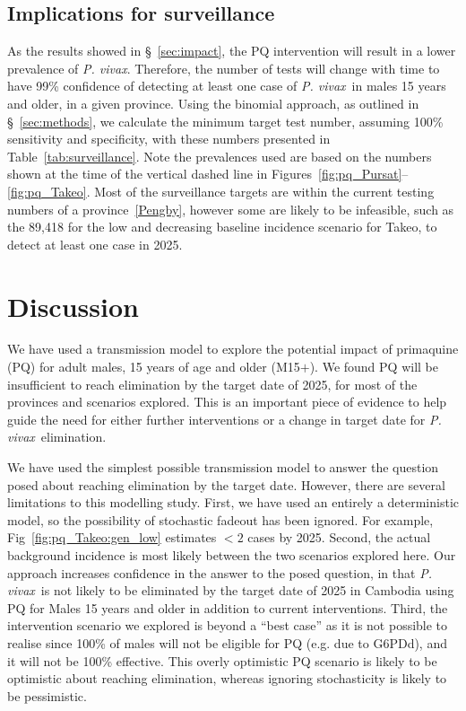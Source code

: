 \documentclass[doublespacing]{bmcart}
\newcommand{\pv}{\textit{P. vivax}}
\newcommand{\males}{M15$+$}
\begin{document}
\subsection*{Implications for surveillance}

As the results showed in \S~\ref{sec:impact}, the PQ intervention will result in a lower prevalence of \pv. Therefore, the number of tests will change with time to have 99\% confidence of detecting at least one case of \pv~in males 15 years and older, in a given province. Using the binomial approach, as outlined in \S~\ref{sec:methods}, we calculate the minimum target test number, assuming 100\% sensitivity and specificity, with these numbers presented in Table~\ref{tab:surveillance}. Note the prevalences used are based on the numbers shown at the time of the vertical dashed line in Figures~\ref{fig:pq_Pursat}--\ref{fig:pq_Takeo}. Most of the surveillance targets are within the current testing numbers of a province~\ref{Pengby}, however some are likely to be infeasible, such as the 89,418 for the low and decreasing baseline incidence scenario for Takeo, to detect at least one case in 2025. 

\section*{Discussion}

We have used a transmission model to explore the potential impact of primaquine (PQ) for adult males, 15 years of age and older (\males). We found PQ will be insufficient to reach elimination by the target date of 2025, for most of the provinces and scenarios explored. This is an important piece of evidence to help guide the need for either further interventions or a change in target date for \pv~elimination. 

We have used the simplest possible transmission model to answer the question posed about reaching elimination by the target date. However, there are several limitations to this modelling study. First, we have used an entirely a deterministic model, so the possibility of stochastic fadeout has been ignored. For example, Fig~\ref{fig:pq_Takeo:gen_low} estimates $<2$ cases by 2025. Second, the actual background incidence is most likely between the two scenarios explored here. Our approach increases confidence in the answer to the posed question, in that \pv~is not likely to be eliminated by the target date of 2025 in Cambodia using PQ for Males 15 years and older in addition to current interventions. Third, the intervention scenario we explored is beyond a ``best case'' as it is not possible to realise since 100\% of males will not be eligible for PQ (e.g. due to G6PDd), and it will not be 100\% effective. This overly optimistic PQ scenario is likely to be optimistic about reaching elimination, whereas ignoring stochasticity is likely to be pessimistic. 
\end{document}
